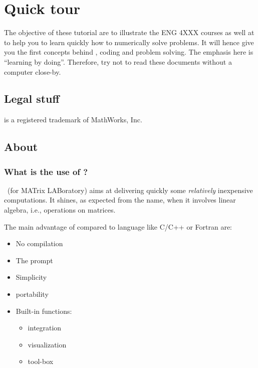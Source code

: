 













\chapter{Quick tour \matlab}


The objective of these tutorial are to illustrate the ENG 4XXX courses as well at to help you to learn quickly how to numerically solve problems.
It will hence give you the first concepts behind \matlab, coding and problem solving.
The emphasis here is “learning by doing”. Therefore, try not to read these documents without a computer close-by.

\section*{Legal stuff}
\matlab is a registered trademark of MathWorks, Inc.


\section{About \matlab}
\subsection{What is the use of \matlab ?}
\matlab~(for MATrix LABoratory) aims at delivering quickly some \emph{relatively} inexpensive computations.
It shines, as expected from the name, when it involves linear algebra, i.e., operations on matrices.

The main advantage of \matlab compared to language like C/C++ or Fortran are:
\begin{itemize}
	\item No compilation
	\item The prompt
	\item Simplicity
	\item portability
	\item Built-in functions:
		\begin{itemize}
			\item integration
			\item visualization
			\item tool-box
		\end{itemize}
\end{itemize}

